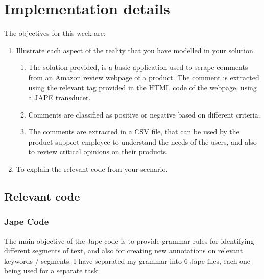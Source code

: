 \documentclass[a4paper,12pt]{report}
\begin{document}
\chapter{Implementation details}
The objectives for this week are:
\begin{enumerate}
 \item Illustrate each aspect of the reality that you have modelled in your solution.

 \begin{enumerate}
  \item The solution provided, is a basic application used to scrape comments from an Amazon review webpage of a product. The comment is extracted using the relevant tag provided in the HTML code of the webpage, using a JAPE transducer.
  \item Comments are classified as positive or negative based on different criteria.
  \item The comments are extracted in a CSV file, that can be used by the product support employee to understand the needs of the users, and also to review critical opinions on their products.
 \end{enumerate}

 
 \item To explain the relevant code from your scenario.


\end{enumerate}

\section{Relevant code}

\subsection{Jape Code}
  The main objective of the Jape code is to provide grammar rules for identifying different segments of text, and also for creating new annotations on relevant keywords / segments. I have separated my grammar into 6 Jape files, each one being used for a separate task.
  
\end{document}
